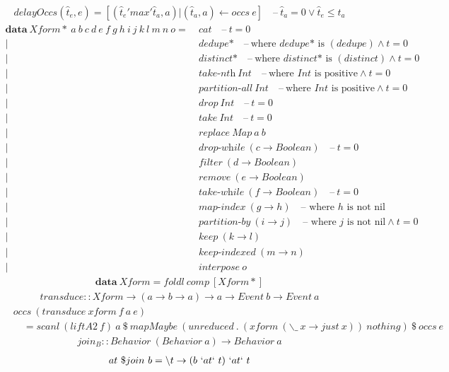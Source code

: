 \documentclass[fleqn]{amsart}
\newcommand{\dash}{\quad\text{--}\ }
\newcommand{\epoch}{t = 0}
\newcommand{\zeroarity}[1]{&\ \textit{#1*} \dash \text{where }\textit{#1*}\text{ is }(#1)}
\newcommand{\positive}[1]{&\ \textit{#1}\ Int \dash \text{where }Int\text{ is positive}}
\newcommand{\integer}[1]{&\ #1\ Int}
\newcommand{\predicate}[2]{&\ \textit{#1}\ (#2 \rightarrow Boolean)}
\newcommand{\nonnillable}[3]{&\ \textit{#1}\ (#2 \rightarrow #3)\quad\text{-- where }#3\text{ is not nil}}
\newcommand{\any}[3]{&\ \textit{#1}\ (#2 \rightarrow #3)}
\begin{document}
\begin{align*}
  delayOccs(\hat{t}_e, e) = [(\hat{t}_e  'max' \hat{t}_a, a) | (\hat{t}_a, a) \leftarrow occs\ e] \dash \hat{t}_a = 0 \lor \hat{t}_e \leq \hat{t}_a
\end{align*}
\begin{align*}
  \mathbf{data}\ Xform{*}\ a\ b\ c\ d\ e\ f\ g\ h\ i\ j\ k\ l\ m\ n\ o =&\ cat \dash \epoch\\
  |\zeroarity{dedupe} \land \epoch\\
  |\zeroarity{distinct} \land \epoch\\
  |\positive{take-nth} \land \epoch\\
  |\positive{partition-all} \land \epoch\\
  |\integer{drop} \dash \epoch\\
  |\integer{take} \dash \epoch\\
  |&\ replace\ Map\ a\ b\\
  |\predicate{drop-while}{c} \dash \epoch\\
  |\predicate{filter}{d}\\
  |\predicate{remove}{e}\\
  |\predicate{take-while}{f} \dash \epoch\\
  |\nonnillable{map-index}{g}{h}\\
  |\nonnillable{partition-by}{i}{j} \land \epoch\\
  |\any{keep}{k}{l}\\
  |\any{keep-indexed}{m}{n}\\
  |&\ interpose\ o
\end{align*}
\begin{align*}
  \mathbf{data}\ Xform = foldl\ comp\ [Xform*]
\end{align*}
\begin{align*}
  transduce :: Xform \rightarrow (a \rightarrow b \rightarrow a) \rightarrow a \rightarrow Event\ b \rightarrow Event\ a
\end{align*}
\begin{align*}
  &occs\ (transduce\ xform\ f\ a\ e)\\
  &\quad= scanl\ (liftA2\ f)\ a\ \$\ mapMaybe\ (unreduced\ .\ (xform\ (\backslash\_\ x\rightarrow just\ x))\ nothing)\ \$\ occs\ e
\end{align*}
\begin{align*}
  join_B :: Behavior\ (Behavior\ a) \rightarrow Behavior\ a
\end{align*}
\begin{align*}
  at\ \$join\ b =\backslash t \rightarrow (b\ `at` \ t)\ `at` \ t
\end{align*}
\end{document}
